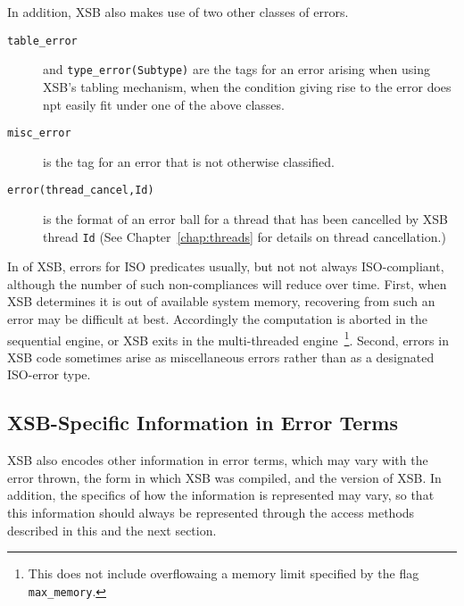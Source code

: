 \noindent
In addition, XSB also makes use of two other classes of errors.
%
\begin{description}
\item[{\tt table\_error}] and {\tt type\_error(Subtype)} are the tags for an
  error arising when using XSB's tabling mechanism, when the condition
  giving rise to the error does npt easily fit under one of the above
  classes.
%
\item[{\tt misc\_error}] is the tag for an error that is not
  otherwise classified.
%
\item[{\tt error(thread\_cancel,Id)}] is the format of an error ball for a
  thread that has been cancelled by XSB thread {\tt Id} (See
  Chapter~\ref{chap:threads} for details on thread cancellation.)
%
\end{description}

In \version{} of XSB, errors for ISO predicates usually, but not not
always ISO-compliant, although the number of such non-compliances will
reduce over time. First, when XSB determines it is out of available
system memory, recovering from such an error may be difficult at best.
Accordingly the computation is aborted in the sequential engine, or
XSB exits in the multi-threaded engine~\footnote{This does not include
  overflowaing a memory limit specified by the flag {\tt
    max\_memory}.}.  Second, errors in XSB code sometimes arise as
miscellaneous errors rather than as a designated ISO-error type.

\subsection{XSB-Specific Information in Error Terms}

XSB also encodes other information in error terms, which may vary with
the error thrown, the form in which XSB was compiled, and the version
of XSB.  In addition, the specifics of how the information is
represented may vary, so that this information should always be
represented through the access methods described in this and the next
section.

